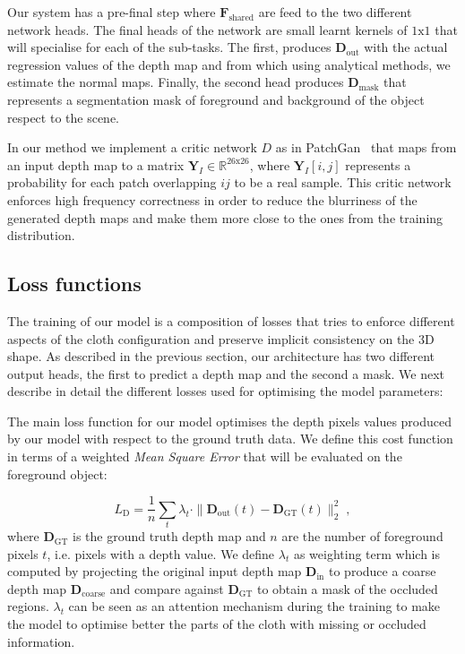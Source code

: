 \vspace{1mm}
 Our system has a pre-final step where $\mathbf{F}_{\textrm{shared}}$ are feed to the two different network heads. The final heads of the network are small learnt kernels of $1\textrm{x}1$ that will specialise for each of the sub-tasks. The first, produces $\mathbf{D}_{\textrm{out}}$ with the actual regression values of the depth map and from which using analytical methods, we estimate the normal maps. Finally, the second head produces $\mathbf{D}_{\textrm{mask}}$ that represents a segmentation mask of foreground and background of the object respect to the scene.


\vspace{1mm}
 In our method we implement a critic network $D$ as in PatchGan~\cite{isola2018imagetoimage} that maps from an input depth map to a matrix $\mathbf{Y}_{I} \in \mathbb{R}^{26\text{x}26}$, where $\mathbf{Y}_I[i,j]$ represents a probability for each patch overlapping $ij$ to be a real sample. This critic network enforces high frequency correctness in order to reduce the blurriness of the generated depth maps and make them more close to the ones from the training distribution.

\subsection{Loss functions}

The training of our model is a composition of losses that tries to enforce different aspects of the cloth configuration and preserve implicit consistency on the 3D shape. As described in the previous section, our architecture has two different output heads, the first to predict a depth map and the second a mask. We next describe in detail the different losses used for optimising the model parameters:

\vspace{1mm}
 The main loss function for our model optimises the depth pixels values produced by our model with respect to the ground truth data. We define this cost function in terms of a weighted \textit{Mean Square Error} that will be evaluated on the foreground object:

\begin{equation}
     L_\textrm{D} = \frac{1}{n}\sum_{t} \lambda_t \cdot \| \mathbf{D}_{\textrm{out}}(t) - \mathbf{D}_{\textrm{GT}}(t) \| _2 ^ 2\;,
\end{equation}
where $\mathbf{D}_{\textrm{GT}}$ is the ground truth depth map and $n$ are the number of foreground pixels $t$, i.e. pixels with a depth value. We define $\lambda_t$ as weighting term which is computed by projecting the original input depth map $\mathbf{D}_{\textrm{in}}$ to produce a coarse depth map $\mathbf{D}_{\textrm{coarse}}$ and compare against $\mathbf{D}_{\textrm{GT}}$ to obtain a mask of the occluded regions. $\lambda_t$ can be seen as an attention mechanism during the training to make the model to optimise better the parts of the cloth with missing or occluded information.

